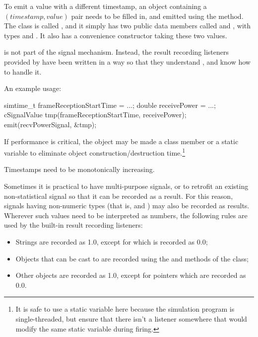 To emit a value with a different timestamp, an object containing
a $(timestamp, value)$ pair needs to be filled in, and emitted using
the  method. The class is called
, and it simply has two public data members called
 and , with types  and .
It also has a convenience constructor taking these two values.

\begin{note}
 is not part of the signal mechanism. Instead,
the result recording listeners provided by {\opp} have been written
in a way so that they understand , and know how
to handle it.
\end{note}

An example usage:

\begin{cpp}
simtime_t frameReceptionStartTime = ...;
double receivePower = ...;
cSignalValue tmp(frameReceptionStartTime, receivePower);
emit(recvPowerSignal, &tmp);
\end{cpp}

If performance is critical, the  object may be
made a class member or a static variable to eliminate object
construction/destruction time.\footnote{It is safe to use a static
variable here because the simulation program is single-threaded,
but ensure that there isn't a listener somewhere that would modify
the same static variable during firing.}

Timestamps need to be monotonically increasing.


Sometimes it is practical to have multi-purpose signals, or to retrofit
an existing non-statistical signal so that it can be recorded as a result.
For this reason, signals having non-numeric types (that is, 
and ) may also be recorded as results. Wherever such values
need to be interpreted as numbers, the following rules are used by the
built-in result recording listeners:

\begin{itemize}
  \item Strings are recorded as 1.0, except for  which is recorded as 0.0;
  \item Objects that can be cast to  are recorded
     using the  and 
     methods of the class;
  \item Other objects are recorded as 1.0, except for  pointers which
     are recorded as 0.0.
\end{itemize}

